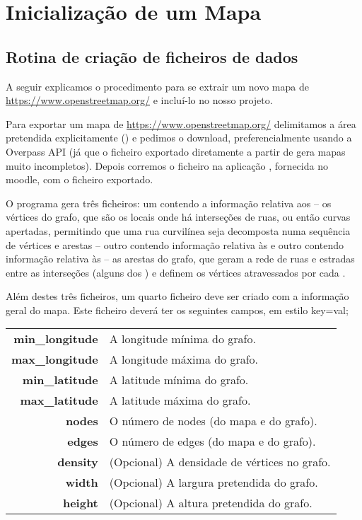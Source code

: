 \documentclass[relatorio.tex]{subfiles}
\begin{document}
\section{Inicialização de um Mapa}
\subsection{Rotina de criação de ficheiros de dados}

A seguir explicamos o procedimento
para se extrair um novo mapa de
\url{https://www.openstreetmap.org/}
e incluí-lo no nosso projeto.

Para exportar um mapa de \url{https://www.openstreetmap.org/}
delimitamos a área pretendida explicitamente
()
e pedimos o download, preferencialmente usando a Overpass API
(já que o ficheiro exportado diretamente a partir de
 gera mapas muito incompletos).
Depois corremos o ficheiro na aplicação ,
fornecida no moodle, com o ficheiro exportado.

O programa gera três ficheiros: um contendo a informação
relativa aos  -- os vértices do grafo, que são os
locais onde há interseções de ruas, ou então curvas apertadas,
permitindo que uma rua curvilínea seja decomposta numa sequência
de vértices e arestas -- outro contendo informação relativa às
 e outro contendo informação relativa às
 -- as arestas do grafo, que geram a rede de
ruas e estradas entre as interseções (alguns dos )
e definem os vértices atravessados por cada .

Além destes três ficheiros, um quarto ficheiro 
deve ser criado com a informação geral do mapa.
Este ficheiro deverá ter os seguintes campos, em estilo key=val;

\begin{center}
\begin{tabular}{rl}
\textbf{min\_longitude} &A longitude mínima do grafo.\\
\textbf{max\_longitude} &A longitude máxima do grafo.\\
\textbf{min\_latitude} &A latitude mínima do grafo.\\
\textbf{max\_latitude} &A latitude máxima do grafo.\\
\textbf{nodes} &O número de nodes (do mapa e do grafo).\\
\textbf{edges} &O número de edges (do mapa e do grafo).\\
\textbf{density} &(Opcional) A densidade de vértices no grafo.\\
\textbf{width} &(Opcional) A largura pretendida do grafo.\\
\textbf{height} &(Opcional) A altura pretendida do grafo.\\
\end{tabular}
\end{center}
\end{document}

